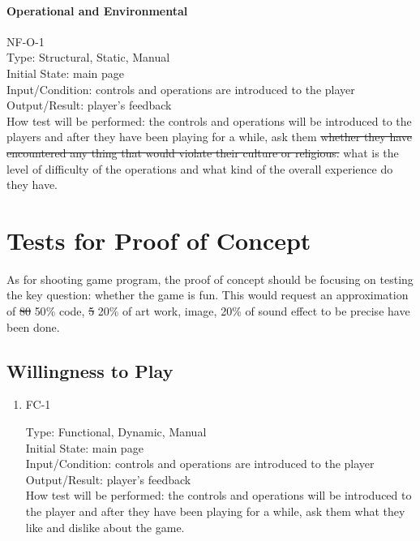 \documentclass[12pt, titlepage]{article}
\begin{document}
\paragraph{Operational and Environmental\\}
{\color{red}NF-O-1}\\
Type: Structural, Static, Manual\\
Initial State: main page \\
Input/Condition: controls and operations are introduced to the player\\
Output/Result: player's feedback\\
How test will be performed: the controls and operations will be introduced to the players and after they have been playing for a while, ask them \sout{whether they have encountered any thing that would violate their culture or religious.}{\color{red} what is the level of difficulty of the operations and what kind of the overall experience do they have.}


\section{Tests for Proof of Concept}
As for shooting game program, the proof of concept should be focusing on testing the key question: whether the game is fun. This would request an approximation of \sout{80} {\color{red} 50}\% code, \sout{5} {\color{red} 20}\% of art work, image, {\color{red} 20\% of sound effect} to be precise have been done.


\subsection{Willingness to Play}

\begin{enumerate}

\item{FC-1\\}

Type: Functional, Dynamic, Manual\\
Initial State: main page\\
Input/Condition: controls and operations are introduced to the player\\
Output/Result: player's feedback\\
How test will be performed: the controls and operations will be introduced to the player and after they have been playing for a while, ask them what they like and dislike about the game.
					

\end{enumerate}
\end{document}
